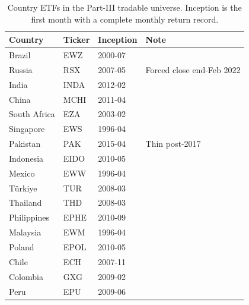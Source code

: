 \begin{table}[h]
  \centering
  \small
  \begin{threeparttable}
  \caption{Country ETFs in the Part-III tradable universe. Inception is the first month with a complete monthly return record.}
  \label{tab:etfs}
  \begin{tabular}{llll}
    \toprule
    Country & Ticker & Inception & Note \\
    \midrule
    Brazil & EWZ & 2000-07 & \\
    Russia & RSX & 2007-05 & Forced close end-Feb 2022 \\
    India & INDA & 2012-02 & \\
    China & MCHI & 2011-04 & \\
    South Africa & EZA & 2003-02 & \\
    Singapore & EWS & 1996-04 & \\
    Pakistan & PAK & 2015-04 & Thin post-2017 \\
    Indonesia & EIDO & 2010-05 & \\
    Mexico & EWW & 1996-04 & \\
    T\"urkiye & TUR & 2008-03 & \\
    Thailand & THD & 2008-03 & \\
    Philippines & EPHE & 2010-09 & \\
    Malaysia & EWM & 1996-04 & \\
    Poland & EPOL & 2010-05 & \\
    Chile & ECH & 2007-11 & \\
    Colombia & GXG & 2009-02 & \\
    Peru & EPU & 2009-06 & \\
    \bottomrule
  \end{tabular}
  \end{threeparttable}
\end{table}
